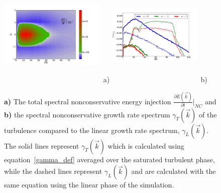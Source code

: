 \documentclass[showpacs,preprintnumbers,amsmath,amssymb,superscriptaddress]{revtex4}
\newcommand{\pdiff}[2]{\frac{\partial#1}{\partial#2}}
\begin{document}
\begin{figure}[!htbp]
\includegraphics[width=0.45\textwidth,height=50mm]{dEdt_nc}~a)
\hfil
\includegraphics[width=0.40\textwidth,height=50mm]{lin_vs_nl_standard}~b)
\hfil
\caption{\textbf{a)} The total spectral nonconservative energy injection $\pdiff{E(\vec{k})}{t} \big|_{NC}$ and
\textbf{b)} the spectral nonconservative growth rate spectrum $\gamma_{T}(\vec{k})$ of the turbulence 
compared to the linear growth rate spectrum, $\gamma_L(\vec{k})$. 
The solid lines represent $\gamma_{T}(\vec{k})$ which is calculated using equation~\ref{gamma_def} averaged over the saturated turbulent phase, 
while the dashed lines represent $\gamma_L(\vec{k})$ and are calculated with the same equation using the linear phase of the simulation.}
\label{dEdt_tot_fig}
\end{figure}
\end{document}

